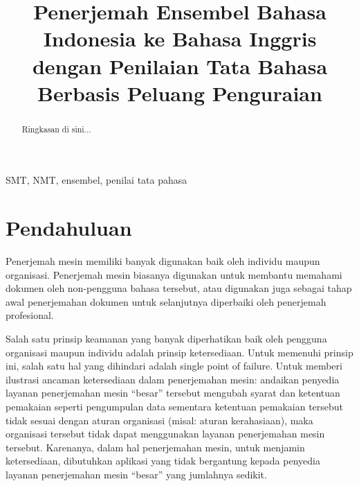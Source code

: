 \documentclass[conference]{IEEEtran}
\begin{document}
\title{Penerjemah Ensembel Bahasa Indonesia ke Bahasa Inggris dengan Penilaian Tata Bahasa Berbasis Peluang Penguraian\\
}

\author{
\and
{}
\and
{}
}

\maketitle

\begin{abstract}
Ringkasan di sini...
\end{abstract}

\begin{IEEEkeywords}
SMT, NMT, ensembel, penilai tata pahasa
\end{IEEEkeywords}

\section{Pendahuluan}

Penerjemah mesin memiliki banyak digunakan baik oleh individu maupun organisasi. Penerjemah mesin biasanya digunakan untuk membantu memahami dokumen oleh non-pengguna bahasa tersebut, atau digunakan juga sebagai tahap awal penerjemahan dokumen untuk selanjutnya diperbaiki oleh penerjemah profesional.

Salah satu prinsip keamanan yang banyak diperhatikan baik oleh pengguna organisasi maupun individu adalah prinsip ketersediaan. Untuk memenuhi prinsip ini, salah satu hal yang dihindari adalah single point of failure. Untuk memberi ilustrasi ancaman ketersediaan dalam penerjemahan mesin: andaikan penyedia layanan penerjemahan mesin “besar” tersebut mengubah syarat dan ketentuan pemakaian seperti pengumpulan data sementara ketentuan pemakaian tersebut tidak sesuai dengan aturan organisasi (misal: aturan kerahasiaan), maka organisasi tersebut tidak dapat menggunakan layanan penerjemahan mesin tersebut. Karenanya, dalam hal penerjemahan mesin, untuk menjamin ketersediaan, dibutuhkan aplikasi yang tidak bergantung kepada penyedia layanan penerjemahan mesin “besar” yang jumlahnya sedikit.
\end{document}
